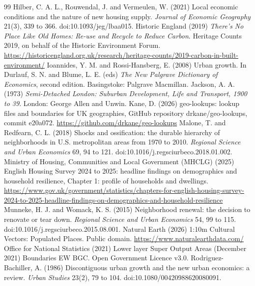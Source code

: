 \documentclass[11pt,a4paper]{article}
\begin{document}
\begin{thebibliography}{99}
 Hilber, C. A. L., Rouwendal, J. and Vermeulen, W. (2021) Local economic conditions and the nature of new housing supply. \textit{Journal of Economic Geography} 21(3), 339 to 366. doi:10.1093/jeg/lbaa015.
 Historic England (2019) \textit{There's No Place Like Old Homes: Re-use and Recycle to Reduce Carbon}. Heritage Counts 2019, on behalf of the Historic Environment Forum. \url{https://historicengland.org.uk/research/heritage-counts/2019-carbon-in-built-environment/}
 Ioannides, Y. M. and Rossi-Hansberg, E. (2008) Urban growth. In Durlauf, S. N. and Blume, L. E. (eds) \textit{The New Palgrave Dictionary of Economics}, second edition. Basingstoke: Palgrave Macmillan.
 Jackson, A. A. (1973) \textit{Semi-Detached London: Suburban Development, Life and Transport, 1900 to 39}. London: George Allen and Unwin.
 Kane, D. (2026) geo-lookups: lookup files and boundaries for UK geographies, GitHub repository drkane/geo-lookups, commit e20a072. \url{https://github.com/drkane/geo-lookups}
 Malone, T. and Redfearn, C. L. (2018) Shocks and ossification: the durable hierarchy of neighborhoods in U.S. metropolitan areas from 1970 to 2010. \textit{Regional Science and Urban Economics} 69, 94 to 121. doi:10.1016/j.regsciurbeco.2018.01.002.
 Ministry of Housing, Communities and Local Government (MHCLG) (2025) English Housing Survey 2024 to 2025: headline findings on demographics and household resilience, Chapter 1: profile of households and dwellings. \url{https://www.gov.uk/government/statistics/chapters-for-english-housing-survey-2024-to-2025-headline-findings-on-demographics-and-household-resilience}
 Munneke, H. J. and Womack, K. S. (2015) Neighborhood renewal: the decision to renovate or tear down. \textit{Regional Science and Urban Economics} 54, 99 to 115. doi:10.1016/j.regsciurbeco.2015.08.001.
 Natural Earth (2026) 1:10m Cultural Vectors: Populated Places. Public domain. \url{https://www.naturalearthdata.com/}
 Office for National Statistics (2021) Lower layer Super Output Areas (December 2021) Boundaries EW BGC. Open Government Licence v3.0.
 Rodriguez-Bachiller, A. (1986) Discontiguous urban growth and the new urban economics: a review. \textit{Urban Studies} 23(2), 79 to 104. doi:10.1080/00420988620080091.

\end{thebibliography}
\end{document}
